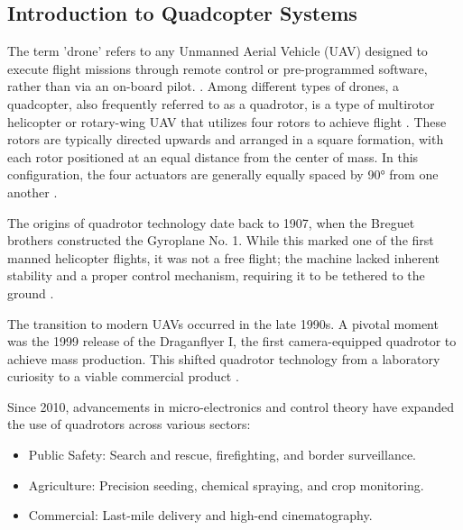 \subsection{Introduction to Quadcopter Systems}

The term 'drone' refers to any Unmanned Aerial Vehicle (UAV) designed to execute flight missions through remote control or pre-programmed software, rather than via an on-board pilot. \parencite{kangunde_review_2021}. Among different types of drones, a quadcopter, also frequently referred to as a quadrotor, is a type of multirotor helicopter or rotary-wing UAV that utilizes four rotors to achieve flight \parencite{luukkonen_modelling_2011}. These rotors are typically directed upwards and arranged in a square formation, with each rotor positioned at an equal distance from the center of mass. In this configuration, the four actuators are generally equally spaced by 90° from one another \parencite{idrissi_review_2022}.

The origins of quadrotor technology date back to 1907, when the Breguet brothers constructed the Gyroplane No. 1. While this marked one of the first manned helicopter flights, it was not a free flight; the machine lacked inherent stability and a proper control mechanism, requiring it to be tethered to the ground \parencite{ghazbi_quadrotors_2016}.

The transition to modern UAVs occurred in the late 1990s. A pivotal moment was the 1999 release of the Draganflyer I, the first camera-equipped quadrotor to achieve mass production. This shifted quadrotor technology from a laboratory curiosity to a viable commercial product \parencite{karahan2025development}.

Since 2010, advancements in micro-electronics and control theory have expanded the use of quadrotors across various sectors:

\begin{itemize}
    \item Public Safety: Search and rescue, firefighting, and border surveillance.
    \item Agriculture: Precision seeding, chemical spraying, and crop monitoring.
    \item Commercial: Last-mile delivery and high-end cinematography.
\end{itemize}






